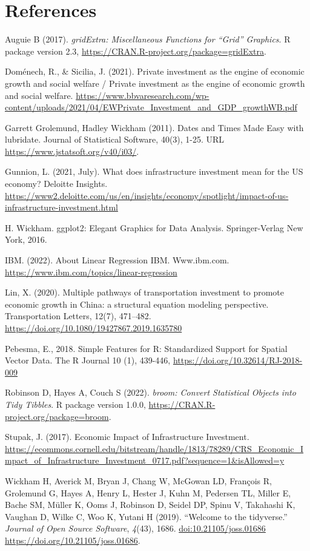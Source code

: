 \documentclass[
]{article}
\begin{document}
\hypertarget{references}{%
\section{References}\label{references}}

Auguie B (2017). \emph{gridExtra: Miscellaneous Functions for ``Grid'' Graphics}. R package
version 2.3, \url{https://CRAN.R-project.org/package=gridExtra}.

Doménech, R., \& Sicilia, J. (2021). Private investment as the engine of economic growth and social welfare / Private investment as the engine of economic growth and social welfare. \url{https://www.bbvaresearch.com/wp-content/uploads/2021/04/EWPrivate_Investment_and_GDP_growthWB.pdf}

Garrett Grolemund, Hadley Wickham (2011). Dates and Times Made Easy with lubridate.
Journal of Statistical Software, 40(3), 1-25. URL \url{https://www.jstatsoft.org/v40/i03/}.

Gunnion, L. (2021, July). What does infrastructure investment mean for the US economy? Deloitte Insights. \url{https://www2.deloitte.com/us/en/insights/economy/spotlight/impact-of-us-infrastructure-investment.html}

H. Wickham. ggplot2: Elegant Graphics for Data Analysis. Springer-Verlag New York, 2016.

IBM. (2022). About Linear Regression \textbar{} IBM. Www.ibm.com. \url{https://www.ibm.com/topics/linear-regression}

Lin, X. (2020). Multiple pathways of transportation investment to promote economic growth in China: a structural equation modeling perspective. Transportation Letters, 12(7), 471--482. \url{https://doi.org/10.1080/19427867.2019.1635780}

Pebesma, E., 2018. Simple Features for R: Standardized Support for Spatial Vector Data.
The R Journal 10 (1), 439-446, \url{https://doi.org/10.32614/RJ-2018-009}

Robinson D, Hayes A, Couch S (2022). \emph{broom: Convert Statistical Objects into Tidy
Tibbles}. R package version 1.0.0, \url{https://CRAN.R-project.org/package=broom}.

Stupak, J. (2017). Economic Impact of Infrastructure Investment. \url{https://ecommons.cornell.edu/bitstream/handle/1813/78289/CRS_Economic_Impact_of_Infrastructure_Investment_0717.pdf?sequence=1\&isAllowed=y}

Wickham H, Averick M, Bryan J, Chang W, McGowan LD, François R, Grolemund G, Hayes A,
Henry L, Hester J, Kuhn M, Pedersen TL, Miller E, Bache SM, Müller K, Ooms J, Robinson
D, Seidel DP, Spinu V, Takahashi K, Vaughan D, Wilke C, Woo K, Yutani H (2019). ``Welcome
to the tidyverse.'' \emph{Journal of Open Source Software}, \emph{4}(43), 1686.
\url{doi:10.21105/joss.01686} \url{https://doi.org/10.21105/joss.01686}.
\end{document}
